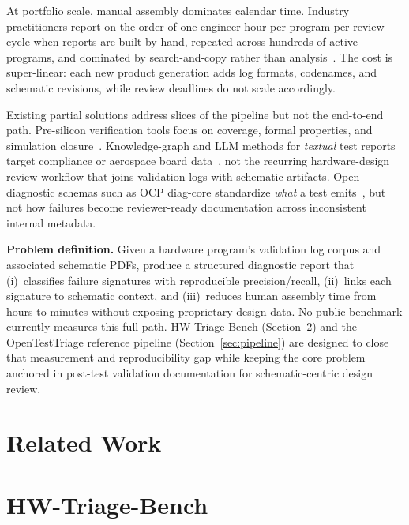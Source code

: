 \documentclass[conference]{IEEEtran}
\begin{document}
At portfolio scale, manual assembly dominates calendar time.
Industry practitioners report on the order of one engineer-hour per program per review cycle when reports are built by hand, repeated across hundreds of active programs, and dominated by search-and-copy rather than analysis~\cite{kanagal2025eda}.
The cost is super-linear: each new product generation adds log formats, codenames, and schematic revisions, while review deadlines do not scale accordingly.

Existing partial solutions address slices of the pipeline but not the end-to-end path.
Pre-silicon verification tools focus on coverage, formal properties, and simulation closure~\cite{seshia2010postsi}.
Knowledge-graph and LLM methods for \emph{textual} test reports target compliance or aerospace board data~\cite{thales2024llmkg}, not the recurring hardware-design review workflow that joins validation logs with schematic artifacts.
Open diagnostic schemas such as OCP diag-core standardize \emph{what} a test emits~\cite{ocpdiagcore}, but not how failures become reviewer-ready documentation across inconsistent internal metadata.

\textbf{Problem definition.}
Given a hardware program's validation log corpus and associated schematic PDFs, produce a structured diagnostic report that (i)~classifies failure signatures with reproducible precision/recall, (ii)~links each signature to schematic context, and (iii)~reduces human assembly time from hours to minutes without exposing proprietary design data.
No public benchmark currently measures this full path.
HW-Triage-Bench (Section~\ref{sec:benchmark}) and the OpenTestTriage reference pipeline (Section~\ref{sec:pipeline}) are designed to close that measurement and reproducibility gap while keeping the core problem anchored in post-test validation documentation for schematic-centric design review.

\section{Related Work}
\label{sec:related}

\section{HW-Triage-Bench}
\label{sec:benchmark}
\end{document}
